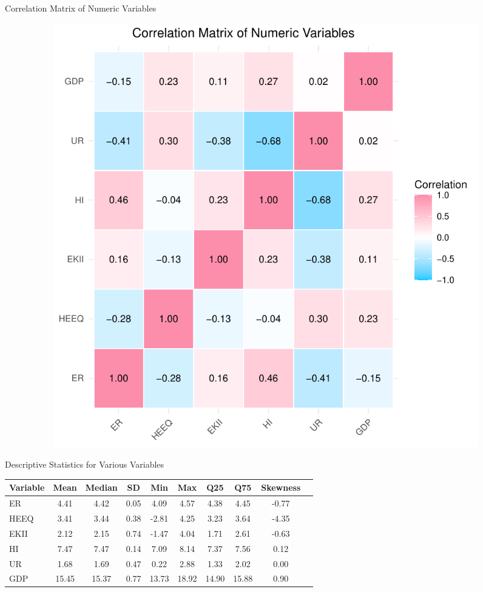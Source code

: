 \documentclass[10pt]{beamer}
\begin{document}
\begin{frame}[fragile]{Correlation Matrix of Numeric Variables}
\begin{figure}
\begin{subfigure}[b]{1\textheight}
\includegraphics{S_E_Ampah_QRE-plot-Correlation-Matrix}
\end{subfigure}
\end{figure}
\end{frame}


\begin{frame}{Descriptive Statistics for Various Variables}
\begin{table}[ht]
\centering
\small 
\begin{tabular}{@{}lccccccccc@{}}
\toprule
Variable & Mean & Median & SD & Min & Max & Q25 & Q75 & Skewness \\ 
\midrule
ER   & 4.41 & 4.42 & 0.05 & 4.09 & 4.57 & 4.38 & 4.45 & -0.77 \\
HEEQ & 3.41 & 3.44 & 0.38 & -2.81 & 4.25 & 3.23 & 3.64 & -4.35 \\
EKII & 2.12 & 2.15 & 0.74 & -1.47 & 4.04 & 1.71 & 2.61 & -0.63 \\
HI   & 7.47 & 7.47 & 0.14 & 7.09 & 8.14 & 7.37 & 7.56 & 0.12 \\
UR   & 1.68 & 1.69 & 0.47 & 0.22 & 2.88 & 1.33 & 2.02 & 0.00 \\
GDP  & 15.45 & 15.37 & 0.77 & 13.73 & 18.92 & 14.90 & 15.88 & 0.90 \\
\bottomrule
\end{tabular}
\end{table}
\end{frame}
\end{document}
